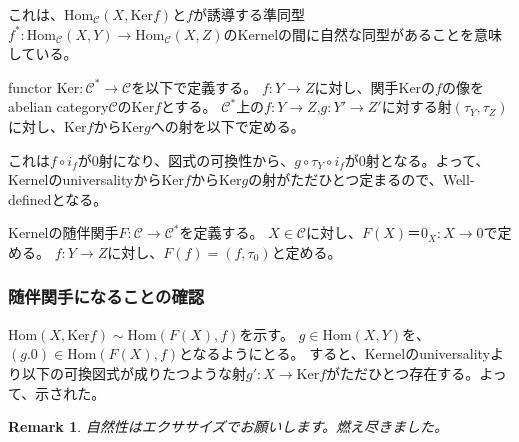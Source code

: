 \documentclass{ujarticle}
\newtheorem*{rem}{Remark}
\begin{document}
これは、$\mathrm{Hom}_{\mathcal{C}}(X,\mathrm{Ker}f)$と$f$が誘導する準同型
$f^*:\mathrm{Hom}_{\mathcal{C}}(X,Y) \to \mathrm{Hom}_{\mathcal{C}}(X,Z)$のKernelの間に自然な同型があることを意味している。

functor $\mathrm{Ker}: \mathcal{C}^* \to \mathcal{C}$を以下で定義する。
$f: Y \to Z$に対し、関手Kerの$f$の像をabelian category$\mathcal{C}$のKer$f$とする。
$ \mathcal{C}^* $上の$f:Y \to Z$,$g:Y' \to Z'$に対する射$(\tau_Y,\tau_Z)$に対し、Ker$f$からKer$g$への射を以下で定める。


これは$f \circ i_f$が0射になり、図式の可換性から、$g \circ \tau_Y \circ i_f$が0射となる。よって、Kernelのuniversalityから$\mathrm{Ker}f$から$\mathrm{Ker}g$の射がただひとつ定まるので、Well-definedとなる。


Kernelの随伴関手$F:\mathcal{C} \to \mathcal{C}^*$を定義する。
$X \in \mathcal{C}$に対し、$F(X)＝0_X:X \to 0$で定める。
$f:Y \to Z$に対し、$F(f)= (f,\tau_{0})$と定める。



\subsubsection{随伴関手になることの確認}
\label{subs:随伴関手になることの確認}

$\mathrm{Hom}(X,\mathrm{Ker}f) \sim \mathrm{Hom}(F(X),f)$を示す。
$g \in \mathrm{Hom}(X,Y)$を、$(g.0) \in \mathrm{Hom}(F(X),f)$となるようにとる。
すると、Kernelのuniversalityより以下の可換図式が成りたつような射$g':X \to \mathrm{Ker}f$がただひとつ存在する。よって、示された。


\begin{rem}
 自然性はエクササイズでお願いします。燃え尽きました。
\end{rem}
\end{document}
